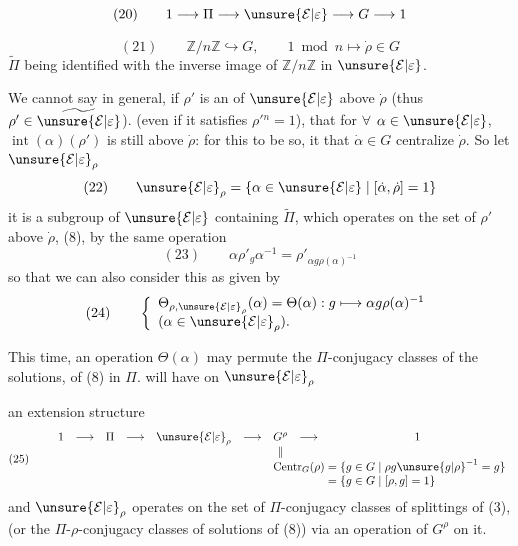 \[
(20)\qquad 1\longrightarrow\Pi\longrightarrow\unsure{\mathcal E|\varepsilon}\longrightarrow G\longrightarrow1
\]


\[
(21)\qquad \mathbb Z/n\mathbb Z\hookrightarrow G,\qquad
1\bmod n\longmapsto\dot\rho\in G
\]
$\widetilde\Pi$ being identified with the inverse image of $\mathbb Z/n\mathbb Z$ in $\unsure{\mathcal E|\varepsilon}$.

We cannot say in general, if $\rho'$ is an  of $\unsure{\mathcal E|\varepsilon}$ above $\dot\rho$ (thus $\rho'\in\widetilde{\unsure{\mathcal E|\varepsilon}}$).
(even if it satisfies $\rho'{}^n=1$), that for $\forall$ $\alpha\in\unsure{\mathcal E|\varepsilon}$, $\operatorname{int}(\alpha)(\rho')$ is still above $\dot\rho$:
for this to be so, it  that $\dot\alpha\in G$ centralize $\dot\rho$. So let $\unsure{\mathcal E|\varepsilon}_\rho$
\[
(22)\qquad
\unsure{\mathcal E|\varepsilon}_\rho=\{\alpha\in\unsure{\mathcal E|\varepsilon}\mid[\dot\alpha,\dot\rho]=1\}
\]
it is a subgroup of $\unsure{\mathcal E|\varepsilon}$ containing $\widetilde\Pi$, which
 operates on the set of  $\rho'$ above $\dot\rho$,
 (8),  by the same operation
\[
(23)\qquad
\alpha\rho'_g\alpha^{-1}=\rho'_{\alpha g\rho(\alpha)^{-1}}
\]
so that we can also consider this  as given by
\[
(24)\qquad
\left\{
\begin{array}{l}
\Theta_{\rho,\unsure{\mathcal E|\varepsilon}_\rho}(\alpha)=\Theta(\alpha):
g\longmapsto\alpha g\rho(\alpha)^{-1}\\
(\alpha\in\unsure{\mathcal E|\varepsilon}_\rho).
\end{array}
\right.
\]

This time, an operation $\Theta(\alpha)$ may permute the $\Pi$-conjugacy classes of the  solutions, of (8) in $\Pi$.
  will have on $\unsure{\mathcal E|\varepsilon}_\rho$


an extension structure
\[
(25)\qquad
\begin{array}{ccccccccc}
1&\longrightarrow&\Pi&\longrightarrow&\unsure{\mathcal E|\varepsilon}_\rho&\longrightarrow&G^\rho&\longrightarrow&1\\
&&&&&&\Vert\\
&&&&&&\multicolumn{3}{l}{\operatorname{Centr}_G(\rho)=\{g\in G\mid\rho g\unsure{g|\rho}^{-1}=g\}}\\
&&&&&&\multicolumn{3}{l}{\phantom{\operatorname{Centr}_G(\rho)}=\{g\in G\mid[\rho,g]=1\}}
\end{array}
\]
and $\unsure{\mathcal E|\varepsilon}_\rho$ operates on the set of $\Pi$-conjugacy classes of splittings of (3), (or the $\Pi$-$\rho$-conjugacy classes of solutions of (8)) via an operation of $G^\rho$ on it.

